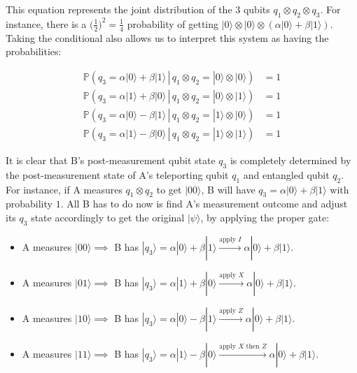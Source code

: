 \documentclass{article}
\theoremstyle{definition}
\begin{document}
\begin{enumerate}
    This equation represents the joint distribution of the 3 qubits $q_1 \otimes q_2 \otimes q_3$. For instance, there is a $\Big(\frac{1}{2} \Big)^2 = \frac{1}{4}$ probability of getting $|0\rangle \otimes |0\rangle \otimes (\alpha |0\rangle + \beta |1\rangle)$. Taking the conditional also allows us to interpret this system as having the probabilities: 

    \begin{align*} 
      \mathbb{P}(q_3 = \alpha|0\rangle + \beta |1\rangle \,|\, q_1 \otimes q_2 = |0\rangle \otimes |0\rangle) &= 1 \\
      \mathbb{P}(q_3 = \alpha|1\rangle + \beta |0\rangle \,|\, q_1 \otimes q_2 = |0\rangle \otimes |1\rangle) &= 1 \\
      \mathbb{P}(q_3 = \alpha|0\rangle - \beta |1\rangle \,|\, q_1 \otimes q_2 = |1\rangle \otimes |0\rangle) &= 1 \\
      \mathbb{P}(q_3 = \alpha|1\rangle - \beta |0\rangle \,|\, q_1 \otimes q_2 = |1\rangle \otimes |1\rangle) &= 1
    \end{align*}

    It is clear that B's post-measurement qubit state $q_3$ is completely determined by the post-measurement state of A's teleporting qubit $q_1$ and entangled qubit $q_2$. For instance, if A measures $q_1 \otimes q_2$ to get $|00\rangle$, B will have $q_3 = \alpha |0\rangle + \beta |1\rangle$ with probability $1$. All B has to do now is find A's measurement outcome and adjust its $q_3$ state accordingly to get the original $|\psi\rangle$, by applying the proper gate: 

    \begin{itemize}
      \item A measures $|00\rangle \implies $ B has $|q_3\rangle = \alpha |0\rangle + \beta |1\rangle \xrightarrow{\text{apply }I} \alpha |0\rangle + \beta |1\rangle$. 
      \item A measures $|01\rangle \implies $ B has $|q_3\rangle = \alpha |1\rangle + \beta |0\rangle \xrightarrow{\text{apply }X} \alpha |0\rangle + \beta |1\rangle$. 
      \item A measures $|10\rangle \implies $ B has $|q_3\rangle = \alpha |0\rangle - \beta |1\rangle \xrightarrow{\text{apply }Z} \alpha |0\rangle + \beta |1\rangle$. 
      \item A measures $|11\rangle \implies $ B has $|q_3\rangle = \alpha |1\rangle - \beta |0\rangle \xrightarrow{\text{apply }X \text{ then } Z} \alpha |0\rangle + \beta |1\rangle$. 
    \end{itemize}
    \end{enumerate}
\end{document}
